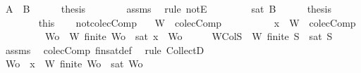 \begin{isabellebody}
\ {\isachardoublequoteopen}{\isasymnot}{\isacharparenleft}A\ {\isasymsubseteq}\ B{\isacharparenright}{\isachardoublequoteclose}\isanewline
\ \ \ \ \isamarkupfalse%
\ {\isacharquery}thesis\isanewline
\ \ \ \ \ \ \isamarkupfalse%
\ assms{\isacharparenleft}{}{\isacharparenright}\ \isamarkupfalse%
\ {\isacharparenleft}rule\ notE{\isacharparenright}\isanewline
\ \ \isamarkupfalse%
\isanewline
\ \ \ \ \isamarkupfalse%
\ {\isachardoublequoteopen}{\isasymnot}{\isacharparenleft}sat\ B{\isacharparenright}{\isachardoublequoteclose}\isanewline
\ \ \ \ \isamarkupfalse%
\ {\isacharquery}thesis\isanewline
\ \ \ \ \ \ \isamarkupfalse%
\ this\isanewline
\ \ \isamarkupfalse%
\isanewline
{}\isamarkupfalse%
%
\endisatagproof
{\isafoldproof}%
%
\isadelimproof
\isanewline
%
\endisadelimproof
\isanewline
{}\isamarkupfalse%
\ not{\isacharunderscore}colecComp{\isacharcolon}\isanewline
\ \ \ {\isachardoublequoteopen}W\ {\isasymin}\ colecComp{\isachardoublequoteclose}\isanewline
\ \ \ \ \ \ \ \ \ \ {\isachardoublequoteopen}{\isacharbraceleft}x{\isacharbraceright}\ {\isasymunion}\ W\ {\isasymnotin}\ colecComp{\isachardoublequoteclose}\isanewline
\ \ \ \ \ \ \ \ \ {\isachardoublequoteopen}{\isasymexists}Wo\ {\isasymsubseteq}\ W{\isachardot}\ finite\ Wo\ {\isasymand}\ {\isasymnot}{\isacharparenleft}sat\ {\isacharparenleft}{\isacharbraceleft}x{\isacharbraceright}\ {\isasymunion}\ Wo{\isacharparenright}{\isacharparenright}{\isachardoublequoteclose}\isanewline
%
\isadelimproof
%
\endisadelimproof
%
\isatagproof
{}\isamarkupfalse%
\ {\isacharminus}\isanewline
\ \ \isamarkupfalse%
\ WCol{\isacharcolon}{\isachardoublequoteopen}{\isasymforall}S{\isacharprime}\ {\isasymsubseteq}\ W{\isachardot}\ finite\ S{\isacharprime}\ {\isasymlongrightarrow}\ sat\ S{\isacharprime}{\isachardoublequoteclose}\isanewline
\ \ \ \ \isamarkupfalse%
\ assms{\isacharparenleft}{}{\isacharparenright}\ \isamarkupfalse%
\ colecComp\ fin{\isacharunderscore}sat{\isacharunderscore}def\ \isamarkupfalse%
\ {\isacharparenleft}rule\ CollectD{\isacharparenright}\ \isanewline
\ \ \isamarkupfalse%
\ {\isachardoublequoteopen}{\isasymnot}{\isacharparenleft}{\isasymforall}Wo\ {\isasymsubseteq}\ {\isacharbraceleft}x{\isacharbraceright}\ {\isasymunion}\ W{\isachardot}\ finite\ Wo\ {\isasymlongrightarrow}\ sat\ Wo{\isacharparenright}{\isachardoublequoteclose}\isanewline

\end{isabellebody}
